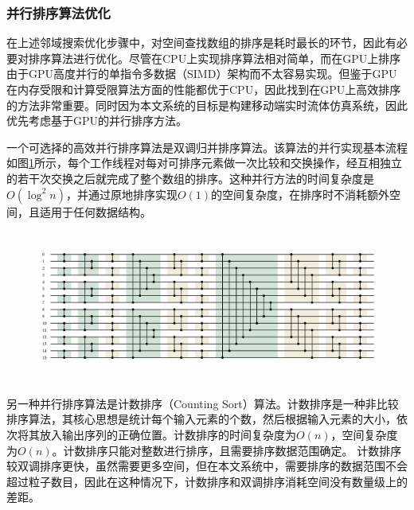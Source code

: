 \subsubsection{并行排序算法优化}
在上述邻域搜索优化步骤中，对空间查找数组的排序是耗时最长的环节，因此有必要对排序算法进行优化。尽管在CPU上实现排序算法相对简单，而在GPU上排序由于GPU高度并行的单指令多数据（SIMD）架构而不太容易实现。但鉴于GPU在内存受限和计算受限算法方面的性能都优于CPU，因此找到在GPU上高效排序的方法非常重要。同时因为本文系统的目标是构建移动端实时流体仿真系统，因此优先考虑基于GPU的并行排序方法。

一个可选择的高效并行排序算法是双调归并排序算法。该算法的并行实现基本流程如图\ref{fig:bitonic}所示，每个工作线程对每对可排序元素做一次比较和交换操作，经互相独立的若干次交换之后就完成了整个数组的排序。这种并行方法的时间复杂度是$O(\log^2 n)$，并通过原地排序实现$O(1)$的空间复杂度，在排序时不消耗额外空间，且适用于任何数据结构。


\begin{figure}[ht]
    \centering
    \includegraphics[height=5cm]{image/bitonicSort.png}
    \label{fig:bitonic}
   \end{figure}

另一种并行排序算法是计数排序（Counting Sort）算法。计数排序是一种非比较排序算法，其核心思想是统计每个输入元素的个数，然后根据输入元素的大小，依次将其放入输出序列的正确位置。计数排序的时间复杂度为$O(n)$，空间复杂度为$O(n)$。计数排序只能对整数进行排序，且需要排序数据范围确定。
计数排序较双调排序更快，虽然需要更多空间，但在本文系统中，需要排序的数据范围不会超过粒子数目，因此在这种情况下，计数排序和双调排序消耗空间没有数量级上的差距。

